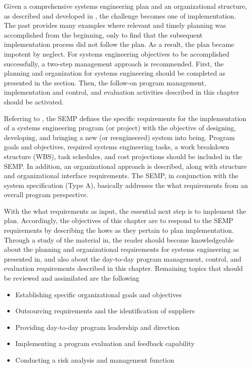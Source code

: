 Given a comprehensive systems engineering plan and an organizational structure, as described and developed in , the challenge becomes one of implementation. The past provides many examples where relevant and timely planning was accomplished from the beginning, only to find that the subsequent implementation process did not follow the plan. As a result, the plan became impotent by neglect. For systems engineering objectives to be accomplished successfully, a two-step management approach is recommended. First, the planning and organization for systems engineering should be completed as presented in the section. Then, the follow-on program management, implementation and control, and evaluation activities described in this chapter should be activated.

Referring to , the SEMP defines the specific requirements for the implementation of a systems engineering program (or project) with the objective of designing, developing, and bringing a new (or reengineered) system into being. Program goals and objectives, required systems engineering tasks, a work breakdown structure (WBS), task schedules, and cost projections should be included in the SEMP. In addition, an organizational approach is described, along with structure and organizational interface requirements. The SEMP, in conjunction with the system specification (Type A), basically addresses the what requirements from an overall program perspective.

With the what requirements as input, the essential next step is to implement the plan. Accordingly, the objectives of this chapter are to respond to the SEMP requirements by describing the hows as they pertain to plan implementation. Through a study of the material in, the reader should become knowledgeable about the planning and organizational requirements for systems engineering as presented in, and also about the day-to-day program management, control, and evaluation requirements described in this chapter. Remaining topics that should be reviewed and assimilated are the following

\begin{itemize}
\item Establishing specific organizational goals and objectives
\item Outsourcing requirements and the identification of suppliers
\item Providing day-to-day program leadership and direction
\item Implementing a program evaluation and feedback capability
\item Conducting a risk analysis and management function
\end{itemize}

